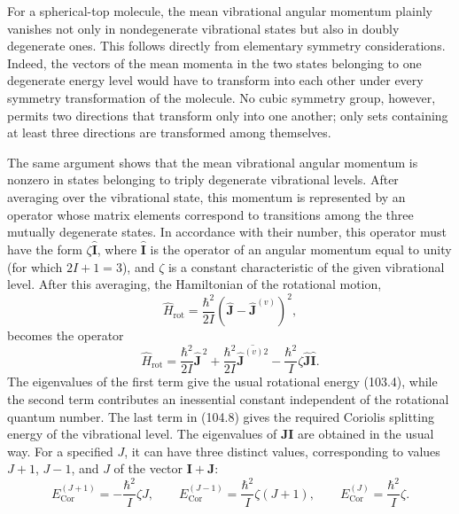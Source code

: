 For a spherical-top molecule, the mean vibrational angular momentum plainly vanishes not only in nondegenerate vibrational states but also in doubly degenerate ones. This follows directly from elementary symmetry considerations. Indeed, the vectors of the mean momenta in the two states belonging to one degenerate energy level would have to transform into each other under every symmetry transformation of the molecule. No cubic symmetry group, however, permits two directions that transform only into one another; only sets containing at least three directions are transformed among themselves.

The same argument shows that the mean vibrational angular momentum is nonzero in states belonging to triply degenerate vibrational levels. After averaging over the vibrational state, this momentum is represented by an operator whose matrix elements correspond to transitions among the three mutually degenerate states. In accordance with their number, this operator must have the form $\zeta\widehat{\mathbf I}$, where $\widehat{\mathbf I}$ is the operator of an angular momentum equal to unity (for which $2I+1=3$), and $\zeta$ is a constant characteristic of the given vibrational level. After this averaging, the Hamiltonian of the rotational motion,
\[
 \widehat H_{\text{rot}}=\frac{\hbar^2}{2I}(\widehat{\mathbf J}-\widehat{\mathbf J}^{(v)})^2,
\]
becomes the operator
\begin{equation}
 \widehat H_{\text{rot}}=\frac{\hbar^2}{2I}\widehat{\mathbf J}^{\,2}
 +\frac{\hbar^2}{2I}\overline{\widehat{\mathbf J}^{(v)2}}
 -\frac{\hbar^2}{I}\zeta\widehat{\mathbf J}\widehat{\mathbf I}.
 \tag{104.8}
\end{equation}
The eigenvalues of the first term give the usual rotational energy (103.4), while the second term contributes an inessential constant independent of the rotational quantum number. The last term in (104.8) gives the required Coriolis splitting energy of the vibrational level. The eigenvalues of $\mathbf J\mathbf I$ are obtained in the usual way. For a specified $J$, it can have three distinct values, corresponding to values $J+1$, $J-1$, and $J$ of the vector $\mathbf I+\mathbf J$:
\begin{equation}
 E_{\text{Cor}}^{(J+1)}=-\frac{\hbar^2}{I}\zeta J,\qquad
 E_{\text{Cor}}^{(J-1)}=\frac{\hbar^2}{I}\zeta(J+1),\qquad
 E_{\text{Cor}}^{(J)}=\frac{\hbar^2}{I}\zeta.
 \tag{104.9}
\end{equation}
